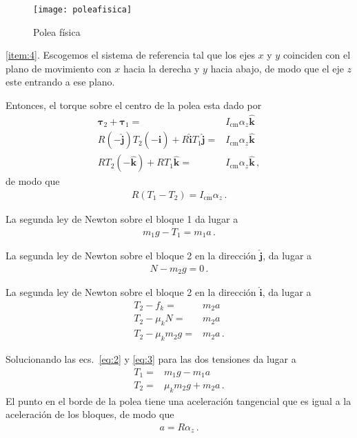   \begin{figure}
    \centering
    \texttt{[image: poleafisica]}
    \caption{Polea física}
    \label{fig:poleafisica}
  \end{figure}

\ref{item:4}. Escogemos el sistema de referencia tal que los ejes $x$ y $y$ coinciden con el plano de movimiento con $x$ hacia la derecha y $y$ hacia abajo, de modo que  el eje $z$ este entrando a ese plano. 

Entonces, el torque sobre el centro de la polea esta dado por
\begin{align}
  \boldsymbol{\tau}_2+\boldsymbol{\tau}_1=&I_{\text{cm}}\alpha_z\hat{\mathbf{k}}\nonumber\\
  R(-\hat{\mathbf{j}})T_2(-\hat{\mathbf{i}})+R\hat{\mathbf{i}}T_1\hat{\mathbf{j}}=&I_{\text{cm}}\alpha_z\hat{\mathbf{k}}\nonumber\\
  RT_2(-\hat{\mathbf{k}})+RT_1\hat{\mathbf{k}}=&I_{\text{cm}}\alpha_z\hat{\mathbf{k}}\,,
\end{align}
de modo que
\begin{align}
  \label{eq:1}
  R(T_1-T_2)=I_{\text{cm}}\alpha_z\,.
\end{align}

La segunda ley de Newton sobre el bloque 1 da lugar a
\begin{align}
  \label{eq:2}
  m_1g-T_1=m_1 a\,.
\end{align}

La segunda ley de Newton sobre el bloque 2 en la dirección $\hat{\mathbf{j}}$, da lugar a
\begin{align}
  N-m_2g=0\,.
\end{align}

La segunda ley de Newton sobre el bloque 2 en la dirección $\hat{\mathbf{i}}$, da lugar a
\begin{align}
  \label{eq:3}
  T_2-f_k=&m_2 a\nonumber\\
  T_2-\mu_k N=&m_2 a\nonumber\\
  T_2-\mu_k m_2 g=&m_2 a\,.
\end{align}

Solucionando las ecs.~\eqref{eq:2} y \eqref{eq:3} para las dos tensiones da lugar a
\begin{align}
  \label{eq:4}
  T_1=&m_1g -m_1 a\nonumber\\
  T_2=&\mu_k m_2 g+m_2 a\,.
\end{align}
El punto en el borde de la polea tiene una aceleración tangencial que es igual a la aceleración de los bloques, de modo que
\begin{align}
  a=R\alpha_z\,.
\end{align}

